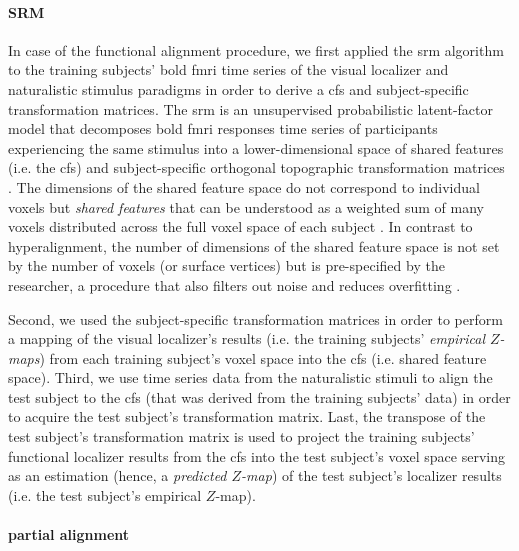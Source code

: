 \paragraph{SRM}


%
In case of the functional alignment procedure, we first applied the \ac{srm}
algorithm \citep{chen2015reduced, richard2019fast} to the training subjects'
\ac{bold} \ac{fmri} time series of the visual localizer and naturalistic
stimulus paradigms in order to derive a \ac{cfs} and subject-specific
transformation matrices.
%
The \ac{srm} is an unsupervised probabilistic latent-factor model that
decomposes \ac{bold} \ac{fmri} responses time series of participants
experiencing the same stimulus into a lower-dimensional space of shared features
(i.e. the \ac{cfs}) and subject-specific orthogonal topographic transformation
matrices \citep{kumar2020brainiak, cohen2017computational}.
%
The dimensions of the shared feature space do not correspond to individual
voxels but \textit{shared features} that can be understood as a weighted sum of
many voxels distributed across the full voxel space of each subject
\citep{kumar2020brainiak}.
%
In contrast to hyperalignment, the number of dimensions of the shared feature
space is not set by the number of voxels (or surface vertices) but is
pre-specified by the researcher, a procedure that also filters out noise and
reduces overfitting \citep{chen2015reduced}.

Second, we used the subject-specific transformation matrices in order to perform
a mapping of the visual localizer's results (i.e. the training subjects'
\textit{empirical $Z$-maps}) from each training subject's voxel space into the
\ac{cfs} (i.e. shared feature space).
Third, we use time series data from the naturalistic stimuli to align the test
subject to the \ac{cfs} (that was derived from the training subjects' data) in
order to acquire the test subject's transformation matrix.
Last, the transpose of the test subject's transformation matrix is used to
project the training subjects' functional localizer results from the \ac{cfs}
into the test subject's voxel space serving as an estimation (hence, a
\textit{predicted $Z$-map}) of the test subject's localizer results (i.e. the
test subject's empirical $Z$-map).


\paragraph{partial alignment}

